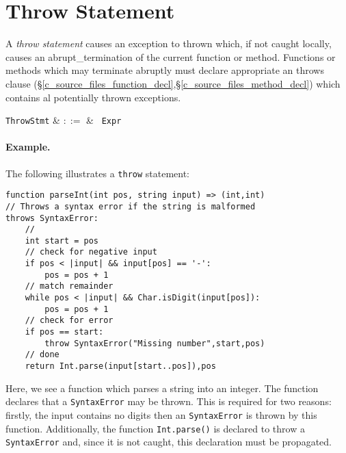 
\section{Throw Statement}
\label{c_stmts_throw}
A {\em throw statement} causes an exception to thrown which, if not caught locally, causes an \gls{abrupt_termination} of the current function or method.  Functions or methods which may terminate abruptly must declare appropriate an throws clause (\S\ref{c_source_files_function_decl},\S\ref{c_source_files_method_decl}) which contains al potentially thrown exceptions.

\begin{syntax}
  \verb+ThrowStmt+ & $::=$ & \ \verb+Expr+\\
\end{syntax}

\paragraph{Example.} The following illustrates a \lstinline{throw} statement:

\begin{lstlisting}
function parseInt(int pos, string input) => (int,int)
// Throws a syntax error if the string is malformed
throws SyntaxError:
    //
    int start = pos
    // check for negative input
    if pos < |input| && input[pos] == '-':
        pos = pos + 1
    // match remainder
    while pos < |input| && Char.isDigit(input[pos]):
        pos = pos + 1
    // check for error
    if pos == start:
        throw SyntaxError("Missing number",start,pos)
    // done
    return Int.parse(input[start..pos]),pos
\end{lstlisting}
Here, we see a function which parses a string into an integer.  The function declares that a \lstinline{SyntaxError} may be thrown.  This is required for two reasons:  firstly, the input contains no digits then an \lstinline{SyntaxError} is thrown by this function.  Additionally, the function \lstinline{Int.parse()} is declared to throw a \lstinline{SyntaxError} and, since it is not caught, this declaration must be propagated.


